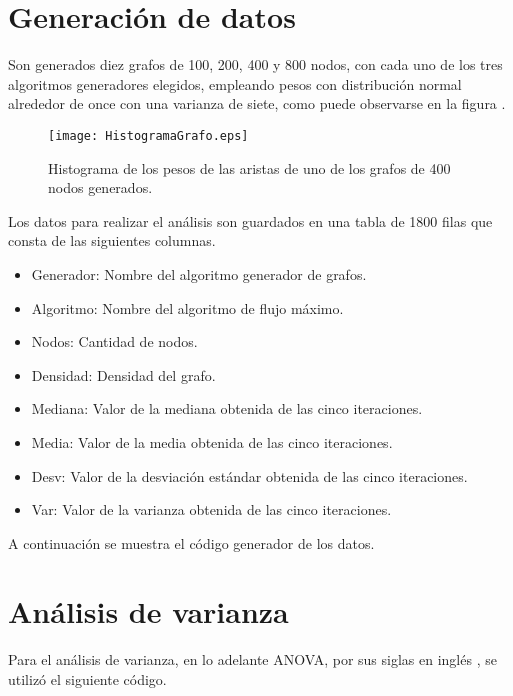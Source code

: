 \documentclass{article}
\begin{document}
\section*{Generación de datos}

Son generados diez grafos de 100, 200, 400 y 800 nodos, con cada uno de los tres algoritmos generadores elegidos, empleando pesos con distribución normal alrededor de once con una varianza de siete, como puede observarse en la figura \pageref{Figura 1}.

\begin{figure}
\begin{center}
  \texttt{[image: HistogramaGrafo.eps]}
\end{center}
\vspace*{-8mm}
\caption{Histograma de los pesos de las aristas de uno de los grafos de 400 nodos generados.}
  \label{Figura 1} 
\end{figure}

Los datos para realizar el análisis son guardados en una tabla de 1800 filas que consta de las siguientes columnas.

\begin{itemize}
\item Generador: Nombre del algoritmo generador de grafos.	
\item Algoritmo: Nombre del algoritmo de flujo máximo.	
\item Nodos: Cantidad de nodos.	
\item Densidad: Densidad del grafo.
\item Mediana: Valor de la mediana obtenida de las cinco iteraciones.	
\item Media: Valor de la media obtenida de las cinco iteraciones.	
\item Desv: Valor de la desviación estándar obtenida de las cinco iteraciones.
\item Var: Valor de la varianza obtenida de las cinco iteraciones.	
\end{itemize}

A continuación se muestra el código generador de los datos.

 

\section*{Análisis de varianza}

Para el análisis de varianza, en lo adelante ANOVA, por sus siglas en inglés \citep{anova}, se utilizó el siguiente código.
\end{document}

